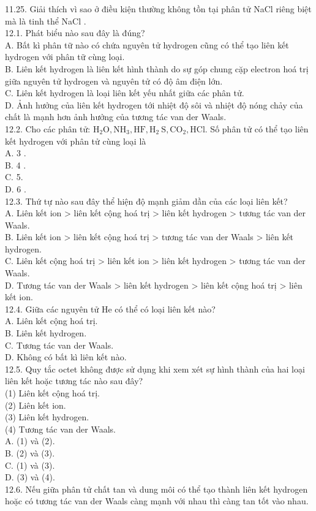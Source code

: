 \documentclass[10pt]{article}
\begin{document}
\begin{enumerate}
11.25. Giải thích vì sao ở điều kiện thường không tồn tại phân tử NaCl riêng biệt mà là tinh thể NaCl .\\
12.1. Phát biểu nào sau đây là đúng?\\
A. Bất kì phân tữ nào có chứa nguyên tử hydrogen cũng có thể tạo liên kết hydrogen với phân tữ cùng loại.\\
B. Liên kết hydrogen là liên kết hình thành do sự góp chung cặp electron hoá trị giữa nguyên tử hydrogen và nguyên tử có độ âm điện lớn.\\
C. Liên kết hydrogen là loại liên kết yếu nhất giữa các phân tử.\\
D. Ảnh hưởng của liên kết hydrogen tới nhiệt độ sôi và nhiệt độ nóng chảy của chất là mạnh hơn ảnh hưởng của tương tác van der Waals.\\
12.2. Cho các phân tử: $\mathrm{H}_{2} \mathrm{O}, \mathrm{NH}_{3}, \mathrm{HF}, \mathrm{H}_{2} \mathrm{~S}, \mathrm{CO}_{2}, \mathrm{HCl}$. Số phân tử có thể tạo liên kết hydrogen với phân tử cùng loại là\\
A. 3 .\\
B. 4 .\\
C. 5.\\
D. 6 .\\
12.3. Thứ tự nào sau đây thể hiện độ mạnh giảm dần của các loại liên kết?\\
A. Liên kết ion > liên kết cộng hoá trị > liên kết hydrogen > tương tác van der Waals.\\
B. Liên kết ion > liên kết cộng hoá trị > tương tác van der Waals > liên kết hydrogen.\\
C. Liên kết cộng hoá trị > liên kết ion > liên kết hydrogen > tương tác van der Waals.\\
D. Tương tác van der Waals > liên kết hydrogen > liên kết cộng hoá trị > liên kết ion.\\
12.4. Giữa các nguyên tử He có thể có loại liên kết nào?\\
A. Liên kết cộng hoá trị.\\
B. Liên kết hydrogen.\\
C. Tương tác van der Waals.\\
D. Không có bất kì liên kết nào.\\
12.5. Quy tắc octet không được sử dụng khi xem xét sự hình thành của hai loại liên kết hoặc tương tác nào sau đây?\\
(1) Liên kết cộng hoá trị.\\
(2) Liên kết ion.\\
(3) Liên kết hydrogen.\\
(4) Tương tác van der Waals.\\
A. (1) và (2).\\
B. (2) và (3).\\
C. (1) và (3).\\
D. (3) và (4).\\
12.6. Nếu giữa phân tử chất tan và dung môi có thể tạo thành liên kết hydrogen hoặc có tương tác van der Waals càng mạnh với nhau thì càng tan tốt vào nhau.
\end{enumerate}
\end{document}
